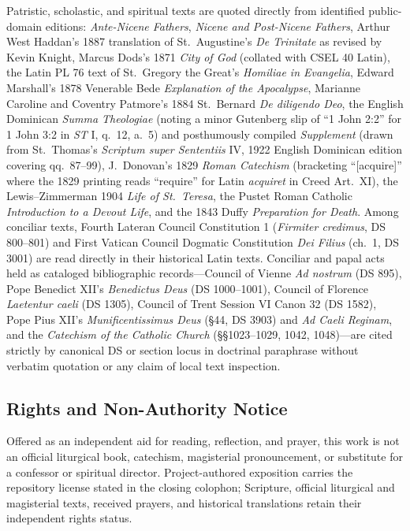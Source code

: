 Patristic, scholastic, and spiritual texts are quoted directly from identified public-domain editions: \textit{Ante-Nicene Fathers}, \textit{Nicene and Post-Nicene Fathers}, Arthur West Haddan's 1887 translation of St.\ Augustine's \textit{De Trinitate} as revised by Kevin Knight, Marcus Dods's 1871 \textit{City of God} (collated with CSEL 40 Latin), the Latin PL 76 text of St.\ Gregory the Great's \textit{Homiliae in Evangelia}, Edward Marshall's 1878 Venerable Bede \textit{Explanation of the Apocalypse}, Marianne Caroline and Coventry Patmore's 1884 St.\ Bernard \textit{De diligendo Deo}, the English Dominican \textit{Summa Theologiae} (noting a minor Gutenberg slip of ``1 John 2:2'' for 1 John 3:2 in \textit{ST} I, q.\ 12, a.\ 5) and posthumously compiled \textit{Supplement} (drawn from St.\ Thomas's \textit{Scriptum super Sententiis} IV, 1922 English Dominican edition covering qq.\ 87--99), J.\ Donovan's 1829 \textit{Roman Catechism} (bracketing ``[acquire]'' where the 1829 printing reads ``require'' for Latin \textit{acquiret} in Creed Art.\ XI), the Lewis--Zimmerman 1904 \textit{Life of St.\ Teresa}, the Pustet Roman Catholic \textit{Introduction to a Devout Life}, and the 1843 Duffy \textit{Preparation for Death}. Among conciliar texts, Fourth Lateran Council Constitution 1 (\textit{Firmiter credimus}, DS 800--801) and First Vatican Council Dogmatic Constitution \textit{Dei Filius} (ch.\ 1, DS 3001) are read directly in their historical Latin texts. Conciliar and papal acts held as cataloged bibliographic records---Council of Vienne \textit{Ad nostrum} (DS 895), Pope Benedict XII's \textit{Benedictus Deus} (DS 1000--1001), Council of Florence \textit{Laetentur caeli} (DS 1305), Council of Trent Session VI Canon 32 (DS 1582), Pope Pius XII's \textit{Munificentissimus Deus} (\S 44, DS 3903) and \textit{Ad Caeli Reginam}, and the \textit{Catechism of the Catholic Church} (\S\S 1023--1029, 1042, 1048)---are cited strictly by canonical DS or section locus in doctrinal paraphrase without verbatim quotation or any claim of local text inspection.

\subsection*{Rights and Non-Authority Notice}

Offered as an independent aid for reading, reflection, and prayer, this work is not an official liturgical book, catechism, magisterial pronouncement, or substitute for a confessor or spiritual director. Project-authored exposition carries the repository license stated in the closing colophon; Scripture, official liturgical and magisterial texts, received prayers, and historical translations retain their independent rights status.
